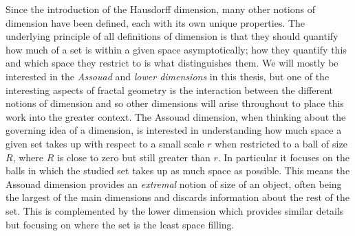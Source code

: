 Since the introduction of the Hausdorff dimension, many other notions of dimension have been defined, each with its own unique properties. The underlying principle of all definitions of dimension is that they should quantify how much of a set is within a given space asymptotically; how they quantify this and which space they restrict to is what distinguishes them. We will mostly be interested in the \textit{Assouad} and \textit{lower dimensions} in this thesis, but one of the interesting aspects of fractal geometry is the interaction between the different notions of dimension and so other dimensions will arise throughout to place this work into the greater context. The Assouad dimension, when thinking about the governing idea of a dimension, is interested in understanding how much space a given set takes up with respect to a small scale $r$ when restricted to a ball of size $R$, where $R$ is close to zero but still greater than $r$. In particular it focuses on the balls in which the studied set takes up as much space as possible. This means the Assouad dimension provides an \textit{extremal} notion of size of an object, often being the largest of the main dimensions and discards information about the rest of the set. This is complemented by the lower dimension which provides similar details but focusing on where the set is the least space filling.  



